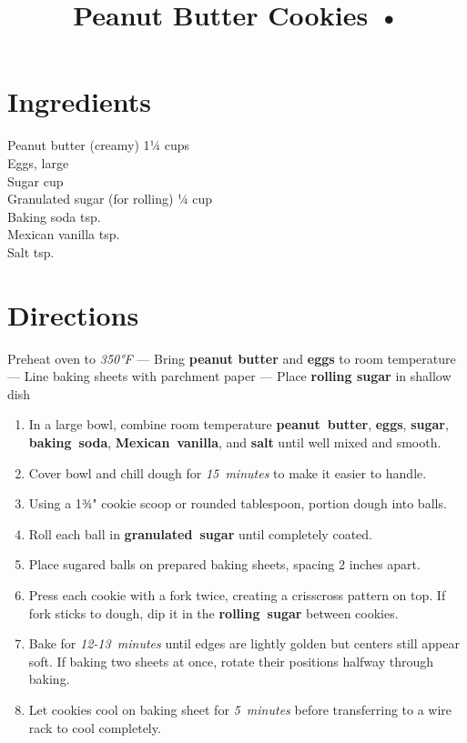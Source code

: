 \documentclass[11pt,letterpaper]{article}
\title{Peanut Butter Cookies •}
\author{}
\date{}
\begin{document}
\maketitle
\thispagestyle{empty}

\section*{Ingredients}
\setlength{\columnsep}{20pt}
\begin{multicols}{2}
\noindent
    Peanut butter (creamy) \dotfill 1¼ cups \\
    Eggs, large  \\
    Sugar  cup \\
    Granulated sugar (for rolling) \dotfill ¼ cup \\
    Baking soda  tsp. \\
    Mexican vanilla  tsp. \\
    Salt  tsp.
\end{multicols}

\section*{Directions}

\noindent
Preheat oven to \textit{350°F} ---
Bring \textbf{peanut butter} and \textbf{eggs} to room temperature ---
Line baking sheets with parchment paper ---
Place \textbf{rolling sugar} in shallow dish

\begin{enumerate}
    \item In a large bowl, combine room temperature \textbf{peanut~butter}, \textbf{eggs}, \textbf{sugar}, \textbf{baking~soda}, \textbf{Mexican~vanilla}, and \textbf{salt} until well mixed and smooth.
    
    \item Cover bowl and chill dough for \textit{15~minutes} to make it easier to handle.
    
    \item Using a 1¾" cookie scoop or rounded tablespoon, portion dough into balls.
    
    \item Roll each ball in \textbf{granulated~sugar} until completely coated.
    
    \item Place sugared balls on prepared baking sheets, spacing 2 inches apart.
    
    \item Press each cookie with a fork twice, creating a crisscross pattern on top. If fork sticks to dough, dip it in the \textbf{rolling~sugar} between cookies.
    
    \item Bake for \textit{12-13~minutes} until edges are lightly golden but centers still appear soft. If baking two sheets at once, rotate their positions halfway through baking.
    
    \item Let cookies cool on baking sheet for \textit{5~minutes} before transferring to a wire rack to cool completely.
\end{enumerate}
\end{document}
